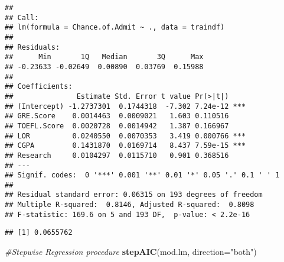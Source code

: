 \documentclass[11pt,]{article}
\newenvironment{Shaded}{\begin{snugshade}}{\end{snugshade}}
\newcommand{\CommentTok}[1]{\textcolor[rgb]{0.56,0.35,0.01}{\textit{#1}}}
\newcommand{\DataTypeTok}[1]{\textcolor[rgb]{0.13,0.29,0.53}{#1}}
\newcommand{\KeywordTok}[1]{\textcolor[rgb]{0.13,0.29,0.53}{\textbf{#1}}}
\newcommand{\NormalTok}[1]{#1}
\newcommand{\OperatorTok}[1]{\textcolor[rgb]{0.81,0.36,0.00}{\textbf{#1}}}
\newcommand{\StringTok}[1]{\textcolor[rgb]{0.31,0.60,0.02}{#1}}
\begin{document}
\begin{verbatim}
## 
## Call:
## lm(formula = Chance.of.Admit ~ ., data = traindf)
## 
## Residuals:
##      Min       1Q   Median       3Q      Max 
## -0.23633 -0.02649  0.00890  0.03769  0.15988 
## 
## Coefficients:
##               Estimate Std. Error t value Pr(>|t|)    
## (Intercept) -1.2737301  0.1744318  -7.302 7.24e-12 ***
## GRE.Score    0.0014463  0.0009021   1.603 0.110516    
## TOEFL.Score  0.0020728  0.0014942   1.387 0.166967    
## LOR          0.0240550  0.0070353   3.419 0.000766 ***
## CGPA         0.1431870  0.0169714   8.437 7.59e-15 ***
## Research     0.0104297  0.0115710   0.901 0.368516    
## ---
## Signif. codes:  0 '***' 0.001 '**' 0.01 '*' 0.05 '.' 0.1 ' ' 1
## 
## Residual standard error: 0.06315 on 193 degrees of freedom
## Multiple R-squared:  0.8146, Adjusted R-squared:  0.8098 
## F-statistic: 169.6 on 5 and 193 DF,  p-value: < 2.2e-16
\end{verbatim}

\begin{Shaded}
\end{Shaded}

\begin{verbatim}
## [1] 0.0655762
\end{verbatim}

\begin{Shaded}
\begin{Highlighting}[]
\CommentTok{#Stepwise Regression procedure}
\KeywordTok{stepAIC}\NormalTok{(mod.lm, }\DataTypeTok{direction=}\StringTok{"both"}\NormalTok{)}
\end{Highlighting}
\end{Shaded}
\end{document}

